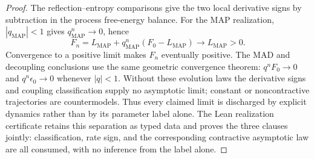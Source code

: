 \begin{proof}
\label{proof:bk5_enhanced_map_mad_duality_pr}
The reflection--entropy comparisons give the two local derivative signs by
subtraction in the process free-energy balance.  For the MAP realization,
$|q_{\mathrm{MAP}}|<1$ gives $q_{\mathrm{MAP}}^n\to0$, hence
\[
F_n=L_{\mathrm{MAP}}+q_{\mathrm{MAP}}^n(F_0-L_{\mathrm{MAP}})
   \longrightarrow L_{\mathrm{MAP}}>0.
\]
Convergence to a positive limit makes $F_n$ eventually positive.  The MAD and
decoupling conclusions use the same geometric convergence theorem:
$q^nF_0\to0$ and $q^n\epsilon_0\to0$ whenever $|q|<1$.
Without these evolution laws the derivative signs and coupling classification
supply no asymptotic limit; constant or noncontractive trajectories are
countermodels.  Thus every claimed limit is discharged by explicit dynamics
rather than by its parameter label alone.  The Lean realization certificate
retains this separation as typed data and proves the three clauses jointly:
classification, rate sign, and the corresponding contractive asymptotic law
are all consumed, with no inference from the label alone.
\end{proof}
